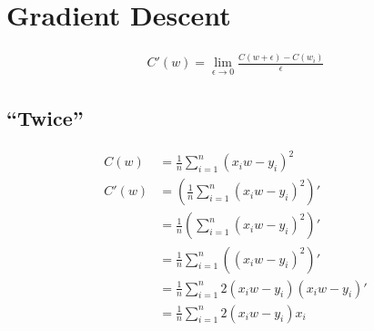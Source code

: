 \documentclass{article}
\begin{document}
\section{Gradient Descent}

\begin{align}
  C'(w) = \lim_{\epsilon \to 0} \frac{C(w + \epsilon) - C(w_i)}{\epsilon}
\end{align}

\subsection{``Twice''}

\begin{align}
  C(w) &= \frac{1}{n}\sum_{i=1}^{n}(x_iw - y_i)^2\\
  C'(w) &= \left(\frac{1}{n}\sum_{i=1}^{n}(x_iw - y_i)^2\right)'\\
       &= \frac{1}{n} \left(\sum_{i=1}^{n}(x_iw - y_i)^2\right)'\\
       &= \frac{1}{n}\sum_{i=1}^{n} \left((x_iw - y_i)^2\right)'\\
       &= \frac{1}{n}\sum_{i=1}^{n}2(x_iw - y_i)\left(x_iw - y_i\right)'\\
       &= \frac{1}{n}\sum_{i=1}^{n}2(x_iw - y_i)x_i
\end{align}
\end{document}
